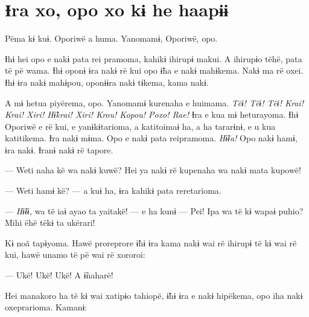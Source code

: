 
 
\chapter{Ɨra xo, opo xo kɨ he haapɨɨ}

 Pëma kɨ kuɨ. Oporiwë a huma. Yanomamɨ, Oporiwë, opo. 


Ɨhɨ hei opo e nakɨ pata rei pramoma, kahikɨ ihirupɨ makui. A ihirupɨo
tëhë, pata të pë wama. Ɨhɨ oponɨ ɨra nakɨ rë kui opo ɨ̃ha e nakɨ
mahɨkema. Nakɨ ma rë oxei. Ɨhɨ ɨra nakɨ mahɨpou, oponɨɨra nakɨ tɨkema,
kama nakɨ. 


A mɨ hetua piyërema, opo. Yanomamɨ kurenaha e huimama. \textit{Tëɨ! Tëɨ! Tëɨ!
Krai! Krai! Xiri! Hɨ̃krai! Xiri! Krou! Kopou! Poxo! Rae!} Ɨra e kua mɨ
heturayoma. Ɨhɨ Oporiwë e rë kui, e yanɨkɨtarioma, a katitoimaɨ ha, a ha
tararɨnɨ, e u kua katitikema. Ɨra nakɨ mɨma. Opo e nakɨ pata reipramoma.
\textit{Hɨ̃ɨa! }Opo nakɨ hamɨ, ɨra nakɨ. Ɨranɨ nakɨ rë tapore. 


--- Weti naha kë wa nakɨ kuwë? Hei ya nakɨ rë kupenaha wa nakɨ mata
kupowë! 


--- Weti hamɨ kë? --- a kuɨ ha, ɨra kahikɨ pata reretarioma.

--- \textit{Hɨ̃ɨɨ,} wa të iaɨ ayao ta yaitakë! --- e ha kunɨ --- Pei! Ipa wa të kɨ
wapaɨ puhio? Mihi ëhë tëkɨ ta ukërari! 

Kɨ noã tapɨyoma. Hawë proreprore ɨ̃hɨ ɨra kama nakɨ wai rë ihirupɨ të kɨ
wai rë kui, hawë unamo të pë wai rë xororoi: 

--- Ukë! Ukë! Ukë! A ɨ̃naharë! 

Hei manakoro ha të kɨ wai xatipɨo tahiopë, ɨ̃hɨ ɨra e nakɨ hipëkema, opo
iha nakɨ oxeprarioma. Kamanɨ: 

